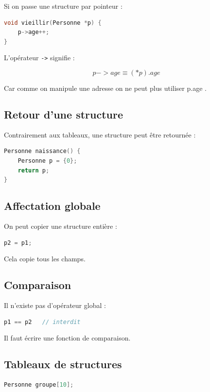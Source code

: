Si on passe une structure par pointeur :

\begin{lstlisting}[language=C]
void vieillir(Personne *p) {
    p->age++;
}
\end{lstlisting}

L’opérateur \texttt{->} signifie :

\[
p->age \equiv (*p).age
\]

Car comme on manipule une adresse on ne peut plus utiliser p.age .

\subsection{Retour d’une structure}

Contrairement aux tableaux,
une structure peut être retournée :

\begin{lstlisting}[language=C]
Personne naissance() {
    Personne p = {0};
    return p;
}
\end{lstlisting}

\subsection{Affectation globale}

On peut copier une structure entière :

\begin{lstlisting}[language=C]
p2 = p1;
\end{lstlisting}

Cela copie tous les champs.

\subsection{Comparaison}

Il n’existe pas d’opérateur global :

\begin{lstlisting}[language=C]
p1 == p2   // interdit
\end{lstlisting}

Il faut écrire une fonction de comparaison.

\subsection{Tableaux de structures}

\begin{lstlisting}[language=C]
Personne groupe[10];
\end{lstlisting}

